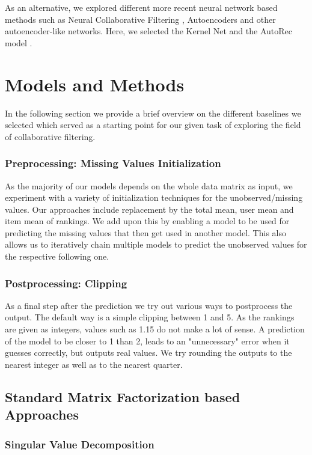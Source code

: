 \documentclass[10pt,conference,compsocconf]{IEEEtran}
\begin{document}
    As an alternative, we explored different more recent neural network based methods such as Neural Collaborative Filtering \cite{DBLP:journals/corr/abs-1708-05031}, Autoencoders \cite{inproceedings} and other autoencoder-like networks.
    Here, we selected the Kernel Net \cite{pmlr-v80-muller18a} and the AutoRec model \cite{inproceedings}.


    \section{Models and Methods}
    In the following section we provide a brief overview on the different baselines we selected which served as a starting point for our given task of exploring the field of collaborative filtering.

    \subsubsection{Preprocessing: Missing Values Initialization}
    As the majority of our models depends on the whole data matrix as input, we experiment with a variety of initialization techniques for the unobserved/missing values.
    Our approaches include replacement by the total mean, user mean and item mean of rankings.
    We add upon this by enabling a model to be used for predicting the missing values that then get used in another model.
    This also allows us to iteratively chain multiple models to predict the unobserved values for the respective following one.

    \subsubsection{Postprocessing: Clipping}
    As a final step after the prediction we try out various ways to postprocess the output.
    The default way is a simple clipping between 1 and 5.
    As the rankings are given as integers, values such as 1.15 do not make a lot of sense.
    A prediction of the model to be closer to 1 than 2, leads to an "unnecessary" error when it guesses correctly, but outputs real values.
    We try rounding the outputs to the nearest integer as well as to the nearest quarter.

    \subsection{Standard Matrix Factorization based Approaches}

    \subsubsection{Singular Value Decomposition}
\end{document}
